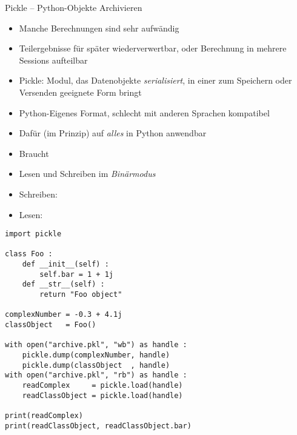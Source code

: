 \begin{frame}[fragile]{Pickle -- Python-Objekte Archivieren}
%
\begin{itemize}
\item Manche Berechnungen sind sehr aufwändig
\item Teilergebnisse für später wiederverwertbar, oder Berechnung in mehrere Sessions aufteilbar
\item Pickle: Modul, das Datenobjekte \emph{serialisiert}, \ie in einer zum Speichern oder Versenden geeignete Form bringt
\item Python-Eigenes Format, schlecht mit anderen Sprachen kompatibel
\item Dafür (im Prinzip) auf \emph{alles} in Python anwendbar
\item Braucht 
\item Lesen und Schreiben im \emph{Binärmodus}
\item Schreiben: 
\item Lesen: 
\end{itemize}
%
\end{frame}


\begin{frame}[fragile]
%
\begin{codebox}
\begin{verbatim}
import pickle

class Foo :
    def __init__(self) :
        self.bar = 1 + 1j
    def __str__(self) :
        return "Foo object"

complexNumber = -0.3 + 4.1j
classObject   = Foo()

with open("archive.pkl", "wb") as handle :
    pickle.dump(complexNumber, handle)
    pickle.dump(classObject  , handle)
with open("archive.pkl", "rb") as handle :
    readComplex     = pickle.load(handle)
    readClassObject = pickle.load(handle)

print(readComplex)
print(readClassObject, readClassObject.bar)
\end{verbatim}
\end{codebox}
%
\end{frame}



